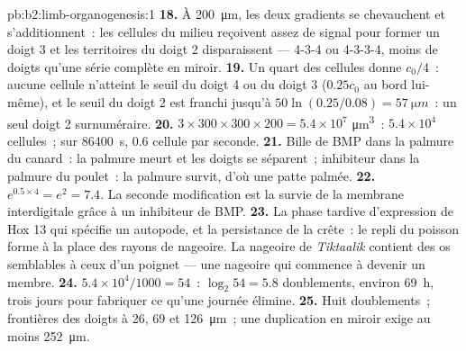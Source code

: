\begin{solution}{pb:b2:limb-organogenesis:1}
\textbf{18.} À \qty{200}{\micro m}, les deux gradients se chevauchent et
s'additionnent~: les cellules du milieu reçoivent assez de signal pour
former un doigt 3 et les territoires du doigt 2 disparaissent --- 4-3-4
ou 4-3-3-4, moins de doigts qu'une série complète en miroir.
\textbf{19.} Un quart des cellules donne $c_0/4$~: aucune cellule
n'atteint le seuil du doigt 4 ou du doigt 3 ($0.25 c_0$ au bord
lui-même), et le seuil du doigt 2 est franchi jusqu'à
$50\ln(0.25/0.08) =
\qty{57}{\micro m}$~: un seul doigt 2 surnuméraire.
\textbf{20.} $3\times 300\times 300\times 200 = 5.4\times 10^{7}$
\unit{\micro m^3}~: $5.4\times 10^{4}$ cellules~; sur \qty{86400}{s},
$0.6$ cellule par seconde.
\textbf{21.} Bille de BMP dans la palmure du canard~: la palmure meurt
et les doigts se séparent~; inhibiteur dans la palmure du poulet~: la
palmure survit, d'où une patte palmée.
\textbf{22.} $e^{0.5\times 4} = e^{2} = 7.4$. La seconde modification est
la survie de la membrane interdigitale grâce à un inhibiteur de BMP.
\textbf{23.} La phase tardive d'expression de Hox 13 qui spécifie un
autopode, et la persistance de la crête~: le repli du poisson forme à la
place des rayons de nageoire. La nageoire de \emph{Tiktaalik} contient
des os semblables à ceux d'un poignet --- une nageoire qui commence à
devenir un membre.
\textbf{24.} $5.4\times 10^{4}/1000 = 54$~: $\log_2 54 = 5.8$ doublements,
environ \qty{69}{h}, trois jours pour fabriquer ce qu'une journée
élimine.
\textbf{25.} Huit doublements~; frontières des doigts à 26, 69 et
\qty{126}{\micro m}~; une duplication en miroir exige au moins
\qty{252}{\micro m}.
\end{solution}
